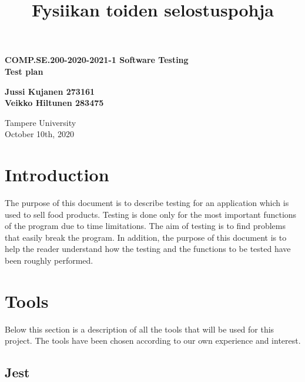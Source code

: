 \documentclass[a4paper, 12pt]{article}
\title{Fysiikan toiden selostuspohja}
\begin{document}
\begin{titlepage}
    \begin{center}
        \vspace*{1cm}
 
        \textbf{COMP.SE.200-2020-2021-1 Software Testing}
        \\
        \textbf{Test plan}
 
        \vspace{0.5cm}
       
             
        \vspace{1.5cm}

        \textbf{Jussi Kujanen 273161}
        \\
        \textbf{Veikko Hiltunen 283475}
 
        \vfill
        \vspace{0.8cm}
        Tampere University\\
        October 10th, 2020
    \end{center}
 \end{titlepage} 



\newpage
\thispagestyle{empty}
\tableofcontents

\newpage
\clearpage
{} 

\section{Introduction}

The purpose of this document is to describe testing for an application which is used to sell food products. Testing is done only for the most important 
functions of the program due to time limitations. The aim of testing is to find problems that easily break the program. In addition, the purpose of this 
document is to help the reader understand how the testing and the functions to be tested have been roughly performed. 

\section{Tools}

Below this section is a description of all the tools that will be used for this project. The tools have been chosen according to our own experience and interest. 

    \subsection{Jest}
\end{document}
